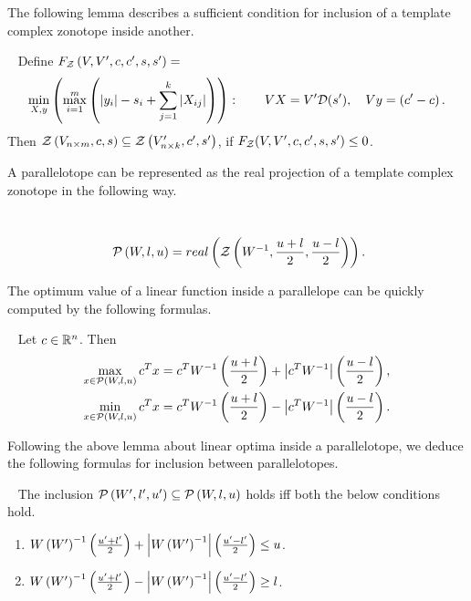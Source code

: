 
The following lemma describes a sufficient condition for inclusion of
a template complex zonotope inside another.
\begin{lemma}~\label{lem:zon-zon} Define $F_{\mathcal{Z}}\left(V,V^\prime,c,c^\prime,s,s^\prime\right) = $
\begin{align}
\begin{split}
\min_{X,y}\left(\max_{i=1}^m\left(\left|y_i\right|-s_i+\sum_{j=1}^{k}\left|X_{ij}\right|\right)\right):~~~~~~VX
= V^\prime\mathcal{D}(s^\prime),~~~Vy = \left(c^\prime-c\right).\\
\end{split}
\end{align}
Then $\mathcal{Z}\left(V_{n\times m},c,s\right)\subseteq \mathcal{Z}\left(V_{n\times
    k}^\prime,c^\prime,s^\prime\right)$, if $F_{\mathcal{Z}}(V,V^\prime,c,c^\prime,s,s^\prime)\leq
0$.
\end{lemma}

A parallelotope can be represented as the real projection of a
template complex zonotope in the following way.
\begin{lemma}~\label{lem:ptope-zon}
\begin{equation}~\label{lem:ptope-zon}\mathcal{P}\left(W,l,u\right) = real\left(\mathcal{Z}\left(W^{-1},\frac{u+l}{2},\frac{u-l}{2}\right) \right).\end{equation}
\end{lemma}

The optimum value of a linear function inside a parallelope can be quickly
computed by the following formulas.
\begin{lemma}~\label{lem:opt-ptope}
Let $c\in\mathbb{R}^n$. Then
\begin{align}
\max_{x\in\mathcal{P}\left(W,l,u\right)}c^Tx = c^TW^{-1}\left(\frac{u+l}{2}\right) + \left|c^TW^{-1}\right|\left(\frac{u-l}{2}\right),\\
\min_{x\in\mathcal{P}\left(W,l,u\right)}c^Tx = c^TW^{-1}\left(\frac{u+l}{2}\right) - \left|c^TW^{-1}\right|\left(\frac{u-l}{2}\right).
\end{align}
\end{lemma}

Following the above lemma about linear optima inside a parallelotope, we
deduce the following formulas for inclusion between parallelotopes.
\begin{lemma}~\label{lem:ptope-ptope}
The inclusion $\mathcal{P}\left(W^\prime,l^\prime,u^\prime\right)\subseteq \mathcal{P}\left(W,l,u\right)$
holds iff both the below conditions hold.
\begin{enumerate}
\item $W\left(W^\prime\right)^{-1}\left(\frac{u^\prime+l^\prime}{2}\right) +
  \left|W\left(W^\prime\right)^{-1}\right|\left(\frac{u^\prime-l^\prime}{2}\right) \leq u$.
\item $W\left(W^\prime\right)^{-1}\left(\frac{u^\prime+l^\prime}{2}\right) -
  \left|W\left(W^\prime\right)^{-1}\right|\left(\frac{u^\prime-l^\prime}{2}\right) \geq l$.
\end{enumerate}
\end{lemma}


